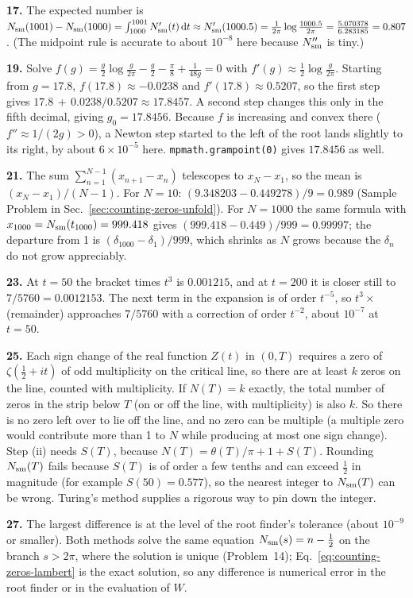 \textbf{17.} The expected number is $N_{\mathrm{sm}}(1001)-N_{\mathrm{sm}}(1000)=\int_{1000}^{1001}N_{\mathrm{sm}}'(t)\,\mathrm{d} t\approx N_{\mathrm{sm}}'(1000.5)=\frac{1}{2\pi}\log\frac{1000.5}{2\pi}=\frac{5.070378}{6.283185}=0.807$. (The midpoint rule is accurate to about $10^{-8}$ here because $N_{\mathrm{sm}}''$ is tiny.)

\textbf{19.} Solve $f(g)=\frac g2\log\frac g{2\pi}-\frac g2-\frac\pi8+\frac1{48g}=0$ with $f'(g)\approx\frac12\log\frac g{2\pi}$. Starting from $g=17.8$, $f(17.8)\approx-0.0238$ and $f'(17.8)\approx0.5207$, so the first step gives $17.8\,+\,0.0238/0.5207\approx17.8457$. A second step changes this only in the fifth decimal, giving $g_0=17.8456$. Because $f$ is increasing and convex there ($f''\approx1/(2g)>0$), a Newton step started to the left of the root lands slightly to its right, by about $6\times10^{-5}$ here. \texttt{mpmath.grampoint(0)} gives $17.8456$ as well.

\textbf{21.} The sum $\sum_{n=1}^{N-1}(x_{n+1}-x_n)$ telescopes to $x_N-x_1$, so the mean is $(x_N-x_1)/(N-1)$. For $N=10$: $(9.348203-0.449278)/9=0.989$ (Sample Problem in Sec.~\ref{sec:counting-zeros-unfold}). For $N=1000$ the same formula with $x_{1000}=N_{\mathrm{sm}}(t_{1000})=999.418$ gives $(999.418-0.449)/999=0.99997$; the departure from 1 is $(\delta_{1000}-\delta_1)/999$, which shrinks as $N$ grows because the $\delta_n$ do not grow appreciably.

\textbf{23.} At $t=50$ the bracket times $t^3$ is $0.001215$, and at $t=200$ it is closer still to $7/5760=0.0012153$. The next term in the expansion is of order $t^{-5}$, so $t^3\times$(remainder) approaches $7/5760$ with a correction of order $t^{-2}$, about $10^{-7}$ at $t=50$.

\textbf{25.} Each sign change of the real function $Z(t)$ in $(0,T)$ requires a zero of $\zeta(\frac12+it)$ of odd multiplicity on the critical line, so there are at least $k$ zeros on the line, counted with multiplicity. If $N(T)=k$ exactly, the total number of zeros in the strip below $T$ (on or off the line, with multiplicity) is also $k$. So there is no zero left over to lie off the line, and no zero can be multiple (a multiple zero would contribute more than 1 to $N$ while producing at most one sign change). Step (ii) needs $S(T)$, because $N(T)=\theta(T)/\pi+1+S(T)$. Rounding $N_{\mathrm{sm}}(T)$ fails because $S(T)$ is of order a few tenths and can exceed $\frac12$ in magnitude (for example $S(50)=0.577$), so the nearest integer to $N_{\mathrm{sm}}(T)$ can be wrong. Turing's method supplies a rigorous way to pin down the integer.

\textbf{27.} The largest difference is at the level of the root finder's tolerance (about $10^{-9}$ or smaller). Both methods solve the same equation $N_{\mathrm{sm}}(s)=n-\frac12$ on the branch $s>2\pi$, where the solution is unique (Problem~14); Eq.~\eqref{eq:counting-zeros-lambert} is the exact solution, so any difference is numerical error in the root finder or in the evaluation of $W$.
